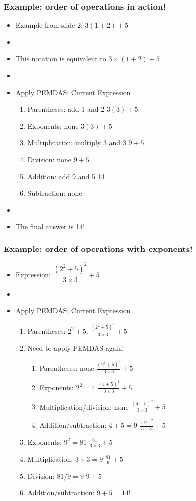 \documentclass[12pt]{beamer}
\newcommand{\myframe}[1]{\begin{frame} \frametitle{#1}}
\begin{document}
\myframe{Example: order of operations in action!}
\begin{itemize}
\item Example from slide 2: $3(1 + 2) + 5$
\item[]
\item This notation is equivalent to $3\times (1+2) + 5$
\item[]
\item Apply PEMDAS: \hfill \underline{Current Expression}
\begin{enumerate}
\item Parentheses: add 1 and 2 \hfill $3(3) + 5$
\item Exponents: none \hfill $3(3) + 5$
\item Multiplication: multiply 3 and 3 \hfill $9 + 5$
\item Division: none \hfill $9 + 5$
\item Addition: add 9 and 5 \hfill 14
\item Subtraction: none
\end{enumerate}
\item[]
\item The final answer is 14!
\end{itemize}
\end{frame}

\myframe{Example: order of operations with exponents!}
\begin{itemize}
\item Expression: $\dfrac{(2^2 + 5)^2}{3\times 3} + 5$
\item[]
\item Apply PEMDAS: \hfill \underline{Current Expression}
\begin{enumerate}
\item Parentheses: $2^2 + 5$. \hfill $\frac{(2^2 + 5)^2}{3\times 3} + 5$
\item[] Need to apply PEMDAS again!
\begin{enumerate}
\item Parentheses: none \hfill $\frac{(2^2 + 5)^2}{3\times 3} + 5$
\item Exponents: $2^2 = 4$ \hfill $\frac{(4 + 5)^2}{3\times 3} + 5$
\item Multiplication/division: none \hfill $\frac{(4 + 5)^2}{3\times 3} + 5$
\item Addition/subtraction: $4 + 5 = 9$ \hfill $\frac{(9)^2}{3\times 3} + 5$
\end{enumerate}
\item Exponents: $9^2 = 81$ \hfill $\frac{81}{3\times 3} + 5$
\item Multiplication: $3 \times 3 = 9$ \hfill $\frac{81}{9} + 5$
\item Division: $81/9 = 9$ \hfill $9 + 5$
\item Addition/subtraction: $9 + 5 = 14$!
\end{enumerate}
\end{itemize}
\end{frame}
\end{document}
